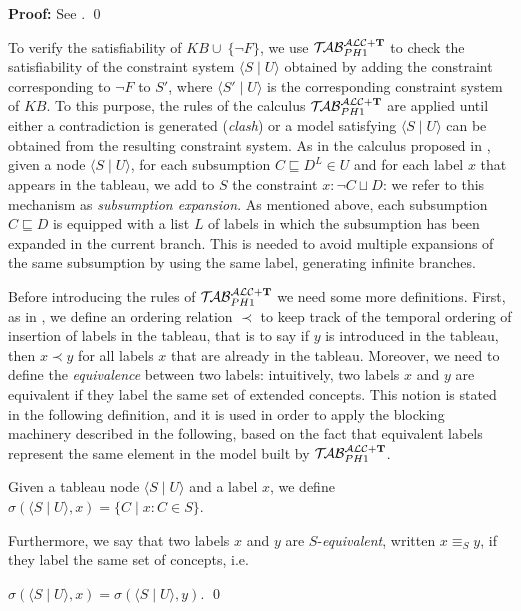 \documentclass[a4paper, 11pt, oneside]{duthesis}
\newcommand{\tip}{{\bf T}}
\newcommand{\unione} {\cup}
\newcommand{\unioneq}{\sqcup}
\newcommand{\nott} {\lnot}
\newcommand{\tc} {\mid}
\newcommand{\sx} {\langle}
\newcommand{\dx} {\rangle}
\newcommand{\primo}{\mathrel{{\mathcal{T}\!\mathcal{AB}}}_{PH 1}^{\mathcal{ALC}+\mbox{\scriptsize $\tip$}}}
\newenvironment{proof}
{\begin{trivlist} \item[] {\bf Proof:}}%
{\qed \end{trivlist}}
\newenvironment{definition}
{\begin{defi} \rm}{\qed \end{defi}}
\newenvironment{proof}
{\begin{trivlist} \item[] {\bf Proof:}}%
{\qed \end{trivlist}}
\newenvironment{definition}
{\begin{defi} \rm}{\qed \end{defi}}
\newtheorem{definition}{Definition}
\newcounter{posu}
\newtheorem{definition}[posu]{Definition}
\newtheorem{proof}[posu]{Proof}
\begin{document}
\begin{proof}
See \cite{Giordano:2013:NDL:2435476.2435957}.
\end{proof}


\noindent To verify the satisfiability of $KB \unione \ \{ \nott F\}$, we use $\primo$ to check the satisfiability of the constraint system $\sx S \tc U \dx$ obtained by adding the constraint corresponding to $\nott F$ to $S'$, where $\sx S' \tc U \dx$ is the corresponding constraint system of $KB$. To this purpose, the rules of the calculus $\primo$ are applied until either a contradiction is generated (\emph{clash}) or a model satisfying $\sx S \tc U \dx$ can be obtained from the resulting constraint system.
As in the calculus proposed in \cite{FI09}, given a node $\sx S \tc U \dx$, for each subsumption $C \sqsubseteq D^L \in U$ and for each label $x$ that appears in the tableau, we add to $S$ the constraint $x: \nott C \unioneq D$: we refer to this mechanism as \emph{subsumption expansion}.
As mentioned above, each subsumption $C \sqsubseteq D$ is equipped with a list $L$ of labels in which the subsumption has been expanded in the current branch.
This is needed to avoid multiple expansions of the same subsumption by using the same label, generating infinite branches.


Before introducing the rules of $\primo$ we need some more definitions.
First, as in \cite{buchheit-et-al}, we define an ordering relation $\prec$ to keep track of the temporal ordering of insertion of labels in the tableau, that is to say if $y$ is introduced in the tableau, then $x \prec y$ for all labels $x$ that are already in the tableau.
Moreover, we need to define the \emph{equivalence} between two labels: intuitively, two labels $x$ and $y$ are equivalent if they label the same set of extended concepts.
This notion is stated in the following definition, and it is used in order to apply the blocking machinery described in the following, based on the fact that equivalent labels represent the same element in the model built by $\primo$.

\begin{definition}
Given a tableau node $\sx S \tc U \dx$ and a label $x$, we define
$\sigma(\sx S \tc U \dx,x)=\{C \tc x: C \in S\}.$

\noindent Furthermore, we say that two labels $x$ and $y$ are $S$-\emph{equivalent}, written $x \equiv_S y$, if they label the same set of concepts, i.e.

$\sigma(\sx S \tc U \dx,x)=\sigma(\sx S \tc U \dx,y).$
\end{definition}
\end{document}
